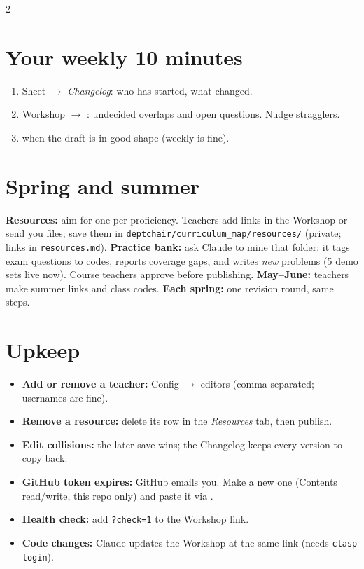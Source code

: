 \documentclass[10pt]{article}
\begin{document}
\begin{multicols}{2}
\section*{Your weekly 10 minutes}
\begin{enumerate}
\item Sheet $\to$ \emph{Changelog}: who has started, what changed.
\item Workshop $\to$ : undecided overlaps and open questions. Nudge stragglers.
\item {} when the draft is in good shape (weekly is fine).
\end{enumerate}

\section*{Spring and summer}
\textbf{Resources:} aim for one per proficiency. Teachers add links in the Workshop or send you files;
save them in \texttt{deptchair/curriculum\_map/resources/} (private; links in \texttt{resources.md}).
\textbf{Practice bank:} ask Claude to mine that folder: it tags exam questions to codes, reports
coverage gaps, and writes \emph{new} problems (5 demo sets live now). Course teachers approve before
publishing. \textbf{May--June:} teachers make summer links and class codes.
\textbf{Each spring:} one revision round, same steps.

\section*{Upkeep}
\begin{itemize}
\item \textbf{Add or remove a teacher:} Config $\to$ editors (comma-separated; usernames are fine).
\item \textbf{Remove a resource:} delete its row in the \emph{Resources} tab, then publish.
\item \textbf{Edit collisions:} the later save wins; the Changelog keeps every version to copy back.
\item \textbf{GitHub token expires:} GitHub emails you. Make a new one (Contents read/write, this repo
  only) and paste it via .
\item \textbf{Health check:} add \texttt{?check=1} to the Workshop link.
\item \textbf{Code changes:} Claude updates the Workshop at the same link (needs \texttt{clasp login}).
\end{itemize}
\end{multicols}
\vspace{-4pt}
\end{document}

